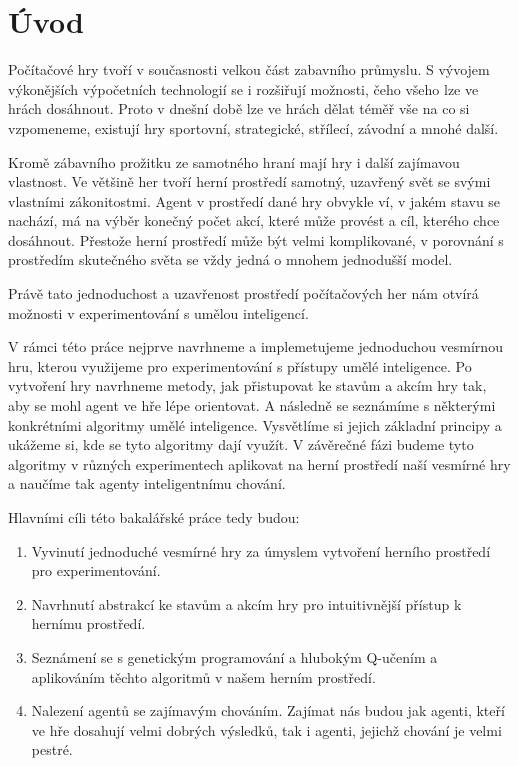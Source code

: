 \chapter*{Úvod}


Počítačové hry tvoří v současnosti velkou část zabavního průmyslu. S vývojem výkonějších výpočetních technologií se i rozšiřují možnosti, čeho všeho lze ve hrách dosáhnout.
Proto v dnešní době lze ve hrách dělat téměř vše na co si vzpomeneme, existují hry sportovní, strategické, střílecí, závodní a mnohé další.
\par
Kromě zábavního prožitku ze samotného hraní mají hry i další zajímavou vlastnost.
Ve většině her tvoří herní prostředí samotný, uzavřený svět se svými vlastními zákonitostmi.
Agent v prostředí dané hry obvykle ví, v jakém stavu se nachází, má na výběr konečný počet akcí, které může provést
a cíl, kterého chce dosáhnout.
Přestože herní prostředí může být velmi komplikované, v porovnání s prostředím skutečného světa se vždy jedná o mnohem jednodušší model.

\par
Právě tato jednoduchost a uzavřenost prostředí počítačových her nám otvírá možnosti v experimentování s umělou inteligencí.

\par
{}
V rámci této práce nejprve navrhneme a implemetujeme jednoduchou vesmírnou hru, kterou využijeme pro experimentování s přístupy umělé inteligence.
Po vytvoření hry navrhneme metody, jak přistupovat ke stavům a akcím hry tak, aby se mohl agent ve hře lépe orientovat.
A následně se seznámíme s některými konkrétními algoritmy umělé inteligence. Vysvětlíme si jejich základní principy a ukážeme si, kde se tyto algoritmy dají využít.
V závěrečné fázi budeme tyto algoritmy v různých experimentech aplikovat na herní prostředí naší vesmírné hry a naučíme tak agenty inteligentnímu chování.


Hlavními cíli této bakalářské práce tedy budou:
\begin{enumerate}
    \item Vyvinutí jednoduché vesmírné hry za úmyslem vytvoření herního prostředí pro experimentování.
    \item Navrhnutí abstrakcí ke stavům a akcím hry pro intuitivnější přístup k hernímu prostředí.
    \item Seznámení se s genetickým programování a hlubokým Q-učením a aplikováním těchto algoritmů v našem herním prostředí.
    \item Nalezení agentů se zajímavým chováním. Zajímat nás budou jak agenti, kteří ve hře dosahují velmi dobrých výsledků, tak i agenti, jejichž chování je velmi pestré.
\end{enumerate}